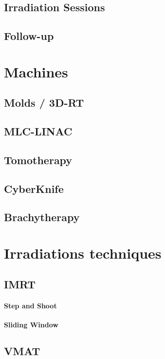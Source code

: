 \subsection{Irradiation Sessions}
\subsection{Follow-up}

\section{Machines}
\subsection{Molds / 3D-RT}
\subsection{MLC-LINAC}
\subsection{Tomotherapy}
\subsection{CyberKnife}
\subsection{Brachytherapy}

\section{Irradiations techniques}
\subsection{IMRT}
\paragraph{Step and Shoot}
\paragraph{Sliding Window}
\subsection{VMAT}

